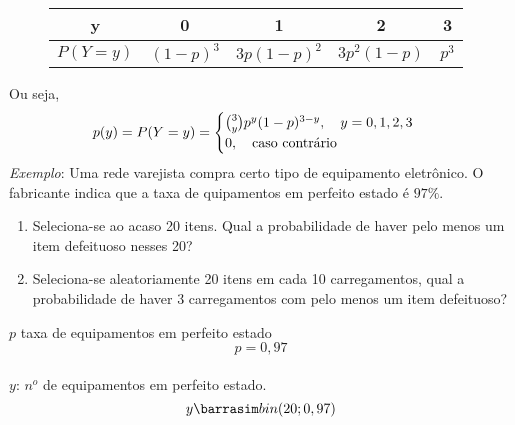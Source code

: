 \documentclass[11pt,a4paper]{article}
\begin{document}
\begin{figure} 
  \centering
  \begin{tabular}{c c c c c}
    \toprule
    y&0&1&2&3\\ \midrule
    $P(Y=y)$&$(1-p)^3$&$3p(1-p)^2$&$3p^2(1-p)$&$p^3$\\ \bottomrule
  \end{tabular}
  \label{fig:7}
\end{figure}
Ou seja,
\begin{align*}
  p(y)=P(Y=y)=\begin{cases}
    \binom{3}{y}p^y (1-p)^{3-y}, \text{\quad}y=0,1,2,3\\
    0, \text{\quad caso contrário}
  \end{cases}
\end{align*}
\emph{Exemplo}: Uma rede varejista compra certo tipo de equipamento eletrônico. O 
fabricante indica que a taxa de quipamentos em perfeito estado é $97\%$.
\begin{enumerate}[label=(\alph*)]
  \item Seleciona-se ao acaso 20 itens. Qual a probabilidade de haver pelo menos 
    um item defeituoso nesses 20?
  \item Seleciona-se aleatoriamente 20 itens em cada 10 carregamentos, qual a 
    probabilidade de haver 3 carregamentos com pelo menos um item defeituoso?
\end{enumerate}
$p$ taxa de equipamentos em perfeito estado\\
$$p=0,97$$\\
$y$: $n^o$ de equipamentos em perfeito estado.\\
$$y \barrasim bin(20;0,97)$$\\
\end{document}

